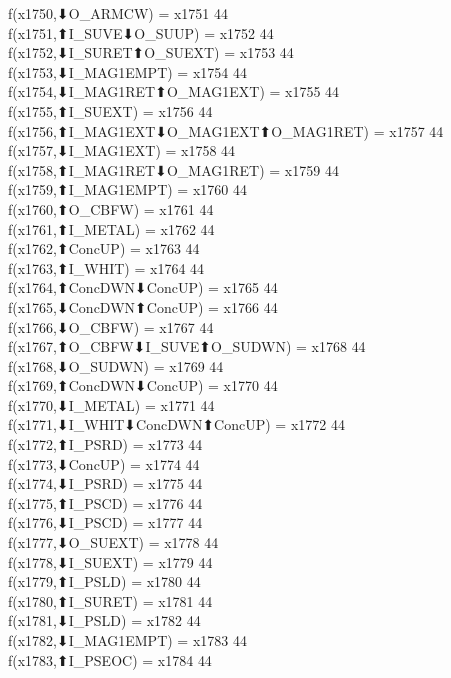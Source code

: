 f(x1750,⬇O_ARMCW) = x1751 {44} \\
f(x1751,⬆I_SUVE⬇O_SUUP) = x1752 {44} \\
f(x1752,⬇I_SURET⬆O_SUEXT) = x1753 {44} \\
f(x1753,⬇I_MAG1EMPT) = x1754 {44} \\
f(x1754,⬇I_MAG1RET⬆O_MAG1EXT) = x1755 {44} \\
f(x1755,⬆I_SUEXT) = x1756 {44} \\
f(x1756,⬆I_MAG1EXT⬇O_MAG1EXT⬆O_MAG1RET) = x1757 {44} \\
f(x1757,⬇I_MAG1EXT) = x1758 {44} \\
f(x1758,⬆I_MAG1RET⬇O_MAG1RET) = x1759 {44} \\
f(x1759,⬆I_MAG1EMPT) = x1760 {44} \\
f(x1760,⬆O_CBFW) = x1761 {44} \\
f(x1761,⬆I_METAL) = x1762 {44} \\
f(x1762,⬆ConcUP) = x1763 {44} \\
f(x1763,⬆I_WHIT) = x1764 {44} \\
f(x1764,⬆ConcDWN⬇ConcUP) = x1765 {44} \\
f(x1765,⬇ConcDWN⬆ConcUP) = x1766 {44} \\
f(x1766,⬇O_CBFW) = x1767 {44} \\
f(x1767,⬆O_CBFW⬇I_SUVE⬆O_SUDWN) = x1768 {44} \\
f(x1768,⬇O_SUDWN) = x1769 {44} \\
f(x1769,⬆ConcDWN⬇ConcUP) = x1770 {44} \\
f(x1770,⬇I_METAL) = x1771 {44} \\
f(x1771,⬇I_WHIT⬇ConcDWN⬆ConcUP) = x1772 {44} \\
f(x1772,⬆I_PSRD) = x1773 {44} \\
f(x1773,⬇ConcUP) = x1774 {44} \\
f(x1774,⬇I_PSRD) = x1775 {44} \\
f(x1775,⬆I_PSCD) = x1776 {44} \\
f(x1776,⬇I_PSCD) = x1777 {44} \\
f(x1777,⬇O_SUEXT) = x1778 {44} \\
f(x1778,⬇I_SUEXT) = x1779 {44} \\
f(x1779,⬆I_PSLD) = x1780 {44} \\
f(x1780,⬆I_SURET) = x1781 {44} \\
f(x1781,⬇I_PSLD) = x1782 {44} \\
f(x1782,⬇I_MAG1EMPT) = x1783 {44} \\
f(x1783,⬆I_PSEOC) = x1784 {44} \\
